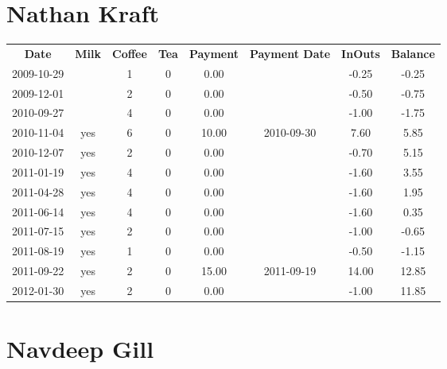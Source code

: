 \section{Nathan Kraft}

\begin{center}
\begin{tabular}{cccccccc}
\textbf{Date} & \textbf{Milk} & \textbf{Coffee} & \textbf{Tea} & \textbf{Payment} & \textbf{Payment Date} & \textbf{InOuts} & \textbf{Balance} \\
2009-10-29 &  & 1 & 0 &  0.00 &  & -0.25 & -0.25\\ 
2009-12-01 &  & 2 & 0 &  0.00 &  & -0.50 & -0.75\\ 
2010-09-27 &  & 4 & 0 &  0.00 &  & -1.00 & -1.75\\ 
2010-11-04 & yes & 6 & 0 & 10.00 & 2010-09-30 &  7.60 &  5.85\\ 
2010-12-07 & yes & 2 & 0 &  0.00 &  & -0.70 &  5.15\\ 
2011-01-19 & yes & 4 & 0 &  0.00 &  & -1.60 &  3.55\\ 
2011-04-28 & yes & 4 & 0 &  0.00 &  & -1.60 &  1.95\\ 
2011-06-14 & yes & 4 & 0 &  0.00 &  & -1.60 &  0.35\\ 
2011-07-15 & yes & 2 & 0 &  0.00 &  & -1.00 & -0.65\\ 
2011-08-19 & yes & 1 & 0 &  0.00 &  & -0.50 & -1.15\\ 
2011-09-22 & yes & 2 & 0 & 15.00 & 2011-09-19 & 14.00 & 12.85\\ 
2012-01-30 & yes & 2 & 0 &  0.00 &  & -1.00 & 11.85
\end{tabular}
\end{center}

\section{Navdeep Gill}

